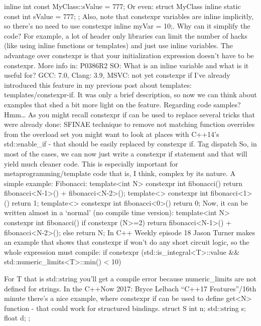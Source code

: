 inline int const MyClass::sValue = 777;
Or even:
struct MyClass
{
    inline static const int sValue = 777;
};
Also, note that constexpr variables are inline implicitly, so there’s no need to use constexpr inline myVar = 10;.
Why can it simplify the code?
For example, a lot of header only libraries can limit the number of hacks (like using inline functions or templates) and just use inline variables.
The advantage over constexpr is that your initialization expression doesn’t have to be constexpr.
More info in: 
P0386R2
SO: What is an inline variable and what is it useful for?
GCC: 7.0, Clang: 3.9, MSVC: not yet
constexpr if
I’ve already introduced this feature in my previous post about templates: templates/constexpr-if. It was only a brief description, so now we can think about examples that shed a bit more light on the feature.
Regarding code samples? Hmm… As you might recall constexpr if can be used to replace several tricks that were already done:
SFINAE technique to remove not matching function overrides from the overload set 
you might want to look at places with C++14’s std::enable_if - that should be easily replaced by constexpr if.
Tag dispatch
So, in most of the cases, we can now just write a constexpr if statement and that will yield much cleaner code. This is especially important for metaprogramming/template code that is, I think, complex by its nature.
A simple example: Fibonacci:
template<int  N>
constexpr int fibonacci() {return fibonacci<N-1>() + fibonacci<N-2>(); }
template<>
constexpr int fibonacci<1>() { return 1; }
template<>
constexpr int fibonacci<0>() { return 0; }
Now, it can be written almost in a ‘normal’ (no compile time version):
template<int N>
constexpr int fibonacci()
{
    if constexpr (N>=2)
        return fibonacci<N-1>() + fibonacci<N-2>();
    else
        return N;
}
In C++ Weekly episode 18 Jason Turner makes an example that shows that constexpr if won’t do any short circuit logic, so the whole expression must compile:
if constexpr (std::is_integral<T>::value && 
              std::numeric_limits<T>::min() < 10)
{

}
For T that is std::string you’ll get a compile error because numeric_limits are not defined for strings.
In the C++Now 2017: Bryce Lelbach “C++17 Features”/16th minute there’s a nice example, where constexpr if can be used to define get<N> function - that could work for structured bindings.
struct S 
{
    int n;
    std::string s;
    float d;
};

